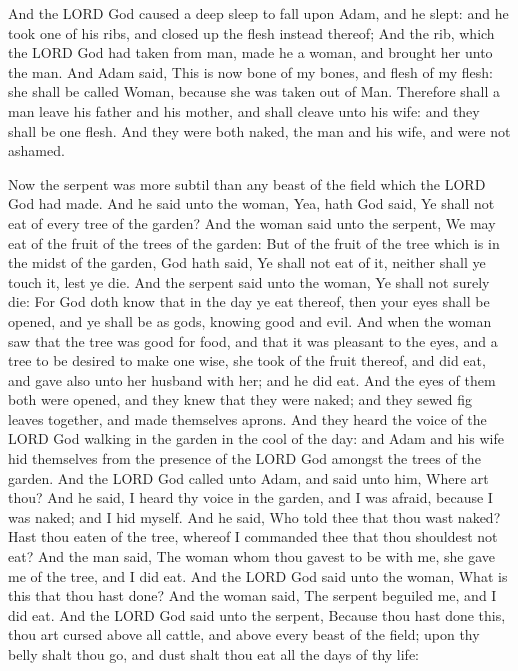 \begin{biblechapter}
\verse And the LORD God caused a deep sleep to fall upon Adam, and he slept: and he took one of his ribs, and closed up the flesh instead thereof;
\verse And the rib, which the LORD God had taken from man, made he a woman, and brought her unto the man.
\verse And Adam said, This is now bone of my bones, and flesh of my flesh: she shall be called Woman, because she was taken out of Man.
\verse Therefore shall a man leave his father and his mother, and shall cleave unto his wife: and they shall be one flesh.
\verse And they were both naked, the man and his wife, and were not ashamed.
\end{biblechapter}

\begin{biblechapter} %
\verse Now the serpent was more subtil than any beast of the field which the LORD God had made. And he said unto the woman, Yea, hath God said, Ye shall not eat of every tree of the garden?
\verse And the woman said unto the serpent, We may eat of the fruit of the trees of the garden:
\verse But of the fruit of the tree which is in the midst of the garden, God hath said, Ye shall not eat of it, neither shall ye touch it, lest ye die.
\verse And the serpent said unto the woman, Ye shall not surely die:
\verse For God doth know that in the day ye eat thereof, then your eyes shall be opened, and ye shall be as gods, knowing good and evil.
\verse And when the woman saw that the tree was good for food, and that it was pleasant to the eyes, and a tree to be desired to make one wise, she took of the fruit thereof, and did eat, and gave also unto her husband with her; and he did eat.
\verse And the eyes of them both were opened, and they knew that they were naked; and they sewed fig leaves together, and made themselves aprons.
\verse And they heard the voice of the LORD God walking in the garden in the cool of the day: and Adam and his wife hid themselves from the presence of the LORD God amongst the trees of the garden.
\verse And the LORD God called unto Adam, and said unto him, Where art thou?
\verse And he said, I heard thy voice in the garden, and I was afraid, because I was naked; and I hid myself.
\verse And he said, Who told thee that thou wast naked? Hast thou eaten of the tree, whereof I commanded thee that thou shouldest not eat?
\verse And the man said, The woman whom thou gavest to be with me, she gave me of the tree, and I did eat.
\verse And the LORD God said unto the woman, What is this that thou hast done? And the woman said, The serpent beguiled me, and I did eat.
\verse And the LORD God said unto the serpent, Because thou hast done this, thou art cursed above all cattle, and above every beast of the field; upon thy belly shalt thou go, and dust shalt thou eat all the days of thy life:

\end{biblechapter}
